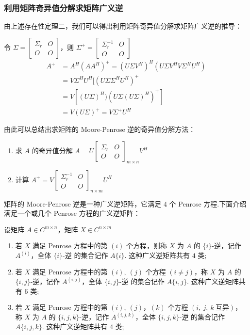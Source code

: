         \subsubsection{利用矩阵奇异值分解求矩阵广义逆}
            \par 由上述存在性定理二，我们可以得出利用矩阵奇异值分解求矩阵广义逆的推导：
            \par 令 $\varSigma = \begin{bmatrix}
                \varSigma_r & O \\ O & O
            \end{bmatrix}$，则 $\varSigma^{+} = \begin{bmatrix}
                \varSigma_r^{-1} & O \\ O & O
            \end{bmatrix}$
            \begin{align*}
                A^{+} &= A^H(AA^H)^{+} = (U\varSigma V^H)^H(U\varSigma V^HV\varSigma^HU^H) \\ &= V\varSigma^HU^H[(U\varSigma\varSigma^HU^H)^{+} \\ &= V[(U\varSigma)^H)(U\varSigma(U\varSigma)^H)^{+}] \\ &= V(U\varSigma)^{+} = V\varSigma^{+}U^H
            \end{align*}
            \par 由此可以总结出求矩阵的 Moore-Penrose 逆的奇异值分解方法：
            \begin{enumerate}
                \item 求 $A$ 的奇异值分解 $A = U\begin{bmatrix}
                    \varSigma_r & O \\ O & O
                \end{bmatrix}_{m \times n}V^H$
                \item 计算 $A^{+} = V\begin{bmatrix}
                    \varSigma_r^{-1} & O \\ O & O
                \end{bmatrix}_{n \times m}U^H$
            \end{enumerate}
            \par 矩阵的 Moore-Penrose 逆是一种广义逆矩阵，它满足 $4$ 个 Penrose 方程.下面介绍满足一个或几个 Penrose 方程的广义逆矩阵：
            \par 设矩阵 $A \in C^{m \times n}$，矩阵 $X \in C^{n \times m}$
            \begin{enumerate}
                \item 若 $X$ 满足 Penrose 方程中的第 $(i)$ 个方程，则称 $X$ 为 $A$ 的 $\{i\}$-逆，记作 $A^{(i)}$，全体 $\{i\}$-逆 的集合记作 $A\{i\}$. 这种广义逆矩阵共有 $4$ 类;
                \item 若 $X$ 满足 Penrose 方程中的第 $(i), \ (j)$ 个方程 $(i \ne j)$，称 $X$ 为 $A$ 的 $\{i,j\}$-逆，记作 $A^{(i,j)}$，全体 $\{i, j\}$-逆 的集合记作 $A\{i,j\}$. 这种广义逆矩阵共有 $6$ 类;
                \item 若 $X$ 满足 Penrose 方程中的第 $(i), \ (j)，(k)$ 个方程 $(i, \ j, \ k \ \textbf{互异})$， 称 $X$ 为 $A$ 的 $\{i,j,k\}$-逆，记作 $A^{(i,j,k)}$，全体 $\{i,j,k\}$-逆 的集合记作 $A\{i,j,k\}$. 这种广义逆矩阵共有 $4$ 类;
            \end{enumerate}
